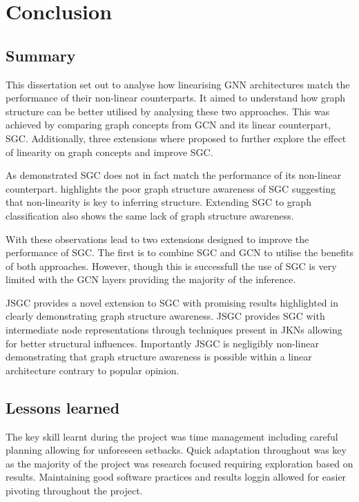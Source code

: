 \chapter{Conclusion}

\section{Summary}
This dissertation set out to analyse how linearising GNN architectures match the performance of their non-linear counterparts.
It aimed to understand how graph structure can be better utilised by analysing these two approaches.
This was achieved by comparing graph concepts from GCN and its linear counterpart, SGC.
Additionally, three extensions where proposed to further explore the effect of linearity on graph concepts and improve SGC.

As  demonstrated SGC does not in fact match the performance of its non-linear counterpart.
 highlights the poor graph structure awareness of SGC suggesting that non-linearity is key to inferring structure.
Extending SGC to graph classification also shows the same lack of graph structure awareness.

With these observations lead to two extensions designed to improve the performance of SGC.
The first is to combine SGC and GCN to utilise the benefits of both approaches.
However, though this is successfull the use of SGC is very limited with the GCN layers providing the majority of the inference.

JSGC provides a novel extension to SGC with promising results highlighted in  clearly demonstrating graph structure awareness.
JSGC provides SGC with intermediate node representations through techniques present in JKNs\cite{xu2018representation} allowing for better structural influences.
Importantly JSGC is negligibly non-linear demonstrating that graph structure awareness is possible within a linear architecture contrary to popular opinion.

\section{Lessons learned}
The key skill learnt during the project was time management including careful planning allowing for unforeseen setbacks.
Quick adaptation throughout was key as the majority of the project was research focused requiring exploration based on results.
Maintaining good software practices and results loggin allowed for easier pivoting throughout the project.

